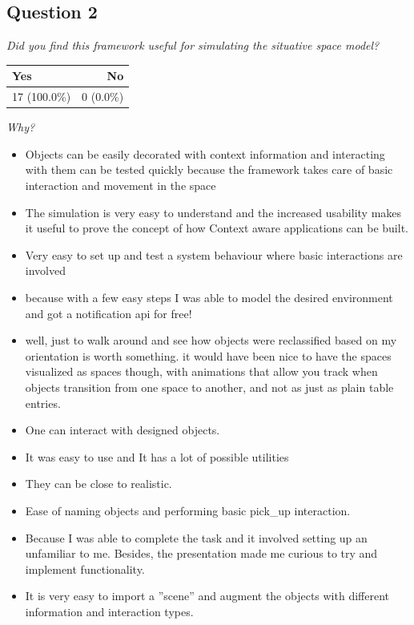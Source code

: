 \subsection{Question 2}\label{question2:2}
\emph{Did you find this framework useful for simulating the situative space model?}
\begin{table}[H]
	\begin{center}
		\small \begin{tabular*}{0.35\columnwidth}{lr}
			\\ \hline \hline
			Yes & No \\ \hline \hline

		 	17 (100.0\%) & 0 (0.0\%)\\ \hline
		\end{tabular*}
	\end{center}
\end{table}

\emph{Why?}
\begin{itemize}
	\item Objects can be easily decorated with context information and interacting with them can be tested quickly because the framework takes care of basic interaction and movement in the space
	\item The simulation is very easy to understand and the increased usability makes it useful to prove the concept of how Context aware applications can be built.
	\item Very easy to set up and test a system behaviour where basic interactions are involved
	\item because with a few easy steps I was able to model the desired environment and got a notification api for free!
	\item well, just to walk around and see how objects were reclassified based on my orientation is worth something. it would have been nice to have the spaces visualized as spaces though, with animations that allow you track when objects transition from one space to another, and not as just as plain table entries.
	\item One can interact with designed objects.
	\item It was easy to use and It has a lot of possible utilities
	\item They can be close to realistic.
	\item Ease of naming objects and performing basic pick\_up interaction.
	\item Because I was able to complete the task and it involved setting up an unfamiliar to me. Besides, the presentation made me curious to try and implement functionality.
	\item It is very easy to import a ''scene'' and augment the objects with different information and interaction types.
\end{itemize}


